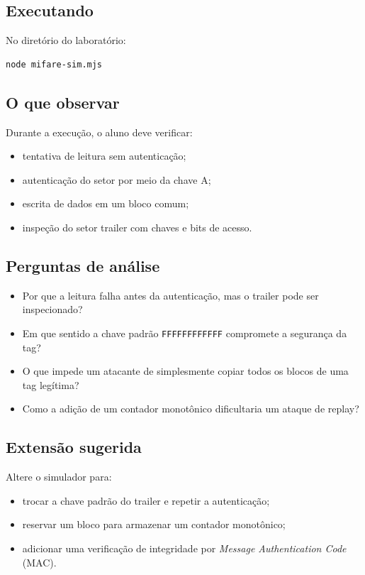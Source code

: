 \subsection{Executando}
No diretório do laboratório:
\begin{verbatim}
node mifare-sim.mjs
\end{verbatim}

\subsection{O que observar}
Durante a execução, o aluno deve verificar:
\begin{itemize}[leftmargin=*]
  \item tentativa de leitura sem autenticação;
  \item autenticação do setor por meio da chave A;
  \item escrita de dados em um bloco comum;
  \item inspeção do setor trailer com chaves e bits de acesso.
\end{itemize}

\subsection{Perguntas de análise}
\begin{itemize}[leftmargin=*]
  \item Por que a leitura falha antes da autenticação, mas o trailer pode ser inspecionado?
  \item Em que sentido a chave padrão \texttt{FFFFFFFFFFFF} compromete a segurança da tag?
  \item O que impede um atacante de simplesmente copiar todos os blocos de uma tag legítima?
  \item Como a adição de um contador monotônico dificultaria um ataque de replay?
\end{itemize}

\subsection{Extensão sugerida}
Altere o simulador para:
\begin{itemize}[leftmargin=*]
  \item trocar a chave padrão do trailer e repetir a autenticação;
  \item reservar um bloco para armazenar um contador monotônico;
  \item adicionar uma verificação de integridade por \textit{Message Authentication Code} (MAC).
\end{itemize}

